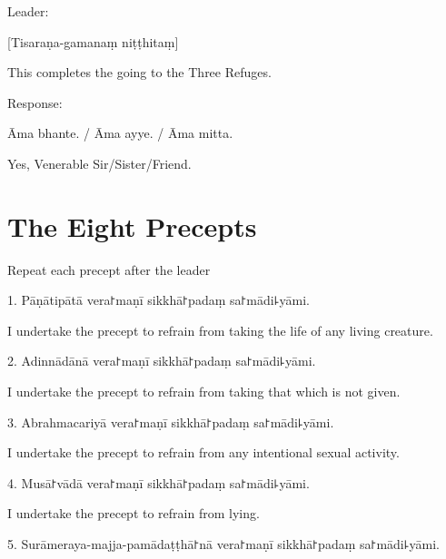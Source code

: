 \begin{instruction}
  Leader:
\end{instruction}

[Tisaraṇa-gamanaṃ niṭṭhitaṃ]

\begin{english}
  This completes the going to the Three Refuges.
\end{english}

\begin{instruction}
  Response:
\end{instruction}

Āma bhante. / Āma ayye. / Āma mitta.

\begin{english}
  Yes, Venerable Sir/Sister/Friend.
\end{english}

\chapter{The Eight Precepts}%

\begin{instruction}
  Repeat each precept after the leader
\end{instruction}

1. Pāṇātipātā vera꜓maṇī sikkhā꜓padaṃ sa꜓mādi꜕yāmi.

\begin{english}
  I undertake the precept to refrain from taking the life of any living creature.
\end{english}

2. Adinnādānā vera꜓maṇī sikkhā꜓padaṃ sa꜓mādi꜕yāmi.

\begin{english}
  I undertake the precept to refrain from taking that which is not given.
\end{english}

3. Abrahmacariyā vera꜓maṇī sikkhā꜓padaṃ sa꜓mādi꜕yāmi.

\begin{english}
  I undertake the precept to refrain from any intentional sexual activity.
\end{english}

4. Musā꜓vādā vera꜓maṇī sikkhā꜓padaṃ sa꜓mādi꜕yāmi.

\begin{english}
  I undertake the precept to refrain from lying.
\end{english}

5. Surāmeraya-majja-pamādaṭṭhā꜓nā vera꜓maṇī sikkhā꜓padaṃ sa꜓mādi꜕yāmi.

